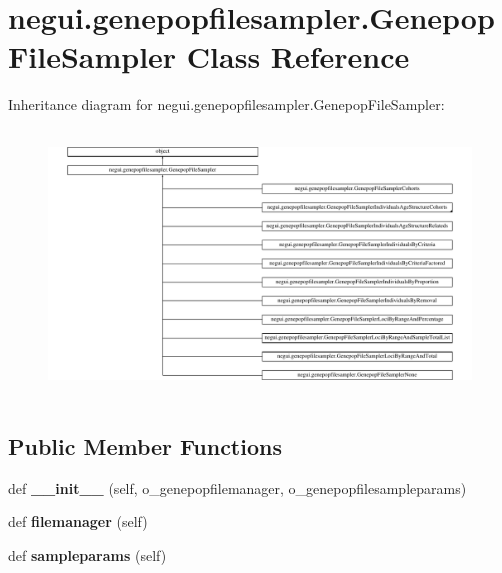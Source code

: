 \hypertarget{classnegui_1_1genepopfilesampler_1_1GenepopFileSampler}{}\section{negui.\+genepopfilesampler.\+Genepop\+File\+Sampler Class Reference}
\label{classnegui_1_1genepopfilesampler_1_1GenepopFileSampler}
Inheritance diagram for negui.\+genepopfilesampler.\+Genepop\+File\+Sampler\+:\begin{figure}[H]
\begin{center}
\leavevmode
\includegraphics[height=7.118644cm]{classnegui_1_1genepopfilesampler_1_1GenepopFileSampler}
\end{center}
\end{figure}
\subsection*{Public Member Functions}
\begin{DoxyCompactItemize}
\item 
def {\bfseries \+\_\+\+\_\+init\+\_\+\+\_\+} (self, o\+\_\+genepopfilemanager, o\+\_\+genepopfilesampleparams)\hypertarget{classnegui_1_1genepopfilesampler_1_1GenepopFileSampler_abcaee019cd11b009568dde7fa2e94341}{}\label{classnegui_1_1genepopfilesampler_1_1GenepopFileSampler_abcaee019cd11b009568dde7fa2e94341}

\item 
def {\bfseries filemanager} (self)\hypertarget{classnegui_1_1genepopfilesampler_1_1GenepopFileSampler_a58431ed64951ef4a3cf813c9ee2624b3}{}\label{classnegui_1_1genepopfilesampler_1_1GenepopFileSampler_a58431ed64951ef4a3cf813c9ee2624b3}

\item 
def {\bfseries sampleparams} (self)\hypertarget{classnegui_1_1genepopfilesampler_1_1GenepopFileSampler_ad48f60ff378a777538a886b058eb0e00}{}\label{classnegui_1_1genepopfilesampler_1_1GenepopFileSampler_ad48f60ff378a777538a886b058eb0e00}

\end{DoxyCompactItemize}


